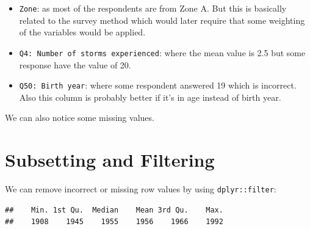 \documentclass[
]{book}
\newenvironment{Shaded}{\begin{snugshade}}{\end{snugshade}}
\newcommand{\CommentTok}[1]{\textcolor[rgb]{0.56,0.35,0.01}{\textit{#1}}}
\newcommand{\DecValTok}[1]{\textcolor[rgb]{0.00,0.00,0.81}{#1}}
\newcommand{\KeywordTok}[1]{\textcolor[rgb]{0.13,0.29,0.53}{\textbf{#1}}}
\newcommand{\NormalTok}[1]{#1}
\newcommand{\OperatorTok}[1]{\textcolor[rgb]{0.81,0.36,0.00}{\textbf{#1}}}
\newcommand{\StringTok}[1]{\textcolor[rgb]{0.31,0.60,0.02}{#1}}
\providecommand{\tightlist}{%
  \setlength{\itemsep}{0pt}\setlength{\parskip}{0pt}}
\begin{document}
\begin{itemize}
\tightlist
\item
  \texttt{Zone}: as most of the respondents are from Zone A. But this is basically related to the survey method which would later require that some weighting of the variables would be applied.
\item
  \texttt{Q4:\ Number\ of\ storms\ experienced}: where the mean value is 2.5 but some response have the value of 20.
\item
  \texttt{Q50:\ Birth\ year}: where some respondent answered 19 which is incorrect. Also this column is probably better if it's in age instead of birth year.
\end{itemize}

We can also notice some missing values.

\hypertarget{subsetting-and-filtering}{%
\section{Subsetting and Filtering}\label{subsetting-and-filtering}}

We can remove incorrect or missing row values by using \texttt{dplyr::filter}:

\begin{Shaded}
\end{Shaded}

\begin{verbatim}
##    Min. 1st Qu.  Median    Mean 3rd Qu.    Max. 
##    1908    1945    1955    1956    1966    1992
\end{verbatim}

\begin{Shaded}
\end{Shaded}
\end{document}
